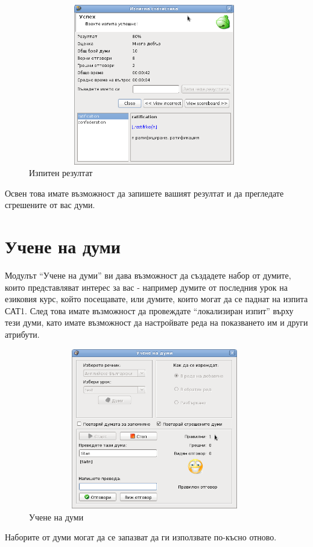 \begin{figure}[htbp]
  \caption{Изпитен резултат}
  \centering
  \includegraphics[width=110mm, height=70mm]{images/exam_score.png}
\end{figure}

Освен това имате възможност да запишете вашият резултат и да
прегледате сгрешените от вас думи. 
\section{Учене на думи}
Модулът "`Учене на думи"' ви дава възможност да създадете набор от
думите, които представляват интерес за вас - например думите от
последния урок на езиковия курс, който посещавате, или думите, които
могат да се паднат на изпита САТ1. След това имате възможност да
провеждате "`локализиран изпит"' върху тези думи, като имате
възможност да настройвате реда на показването им и други атрибути.

\begin{figure}[htbp]
  \caption{Учене на думи}
  \centering
  \includegraphics[width=110mm, height=70mm]{images/study_words.png}
\end{figure}

Наборите от думи могат да се запазват да ги използвате по-късно
отново.

